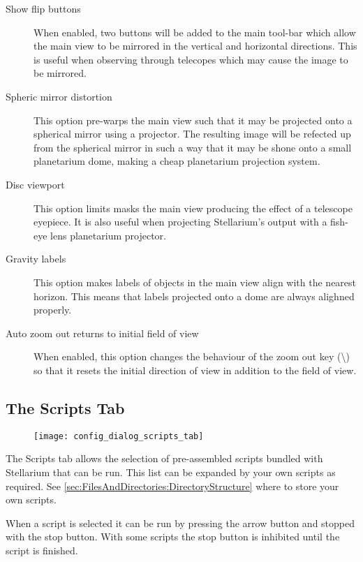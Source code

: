 \begin{description}
\item[Show flip buttons] When enabled, two buttons will be added to
  the main tool-bar which allow the main view to be mirrored in the
  vertical and horizontal directions. This is useful when observing
  through telecopes which may cause the image to be mirrored.
\item[Spheric mirror distortion] This option pre-warps the main view
  such that it may be projected onto a spherical mirror using a
  projector. The resulting image will be refected up from the spherical
  mirror in such a way that it may be shone onto a small planetarium
  dome, making a cheap planetarium projection system.
\item[Disc viewport] This option limits masks the main view
  producing the effect of a telescope eyepiece. It is also useful when
  projecting Stellarium's output with a fish-eye lens planetarium
  projector.
\item[Gravity labels] This option makes labels of objects in the
  main view align with the nearest horizon. This means that labels
  projected onto a dome are always alighned properly.
\item[Auto zoom out returns to initial field of view] When enabled,
  this option changes the behaviour of the zoom out key
  (\textbackslash{}) so that it resets the initial direction of view in
  addition to the field of view.
\end{description}

\subsection{The Scripts Tab}
\label{sec:gui:scripts}


\begin{figure}[h]
\centering\texttt{[image: config\_dialog\_scripts\_tab]}
\label{fig:gui:scripts}
\end{figure}

The Scripts tab allows the selection of pre-assembled scripts bundled
with Stellarium that can be run. This list can be expanded by your own
scripts as required. See
\ref{sec:FilesAndDirectories:DirectoryStructure} where to store your
own scripts.

When a script is selected it can be run by pressing the arrow button
and stopped with the stop button. With some scripts the stop button is
inhibited until the script is finished. %

